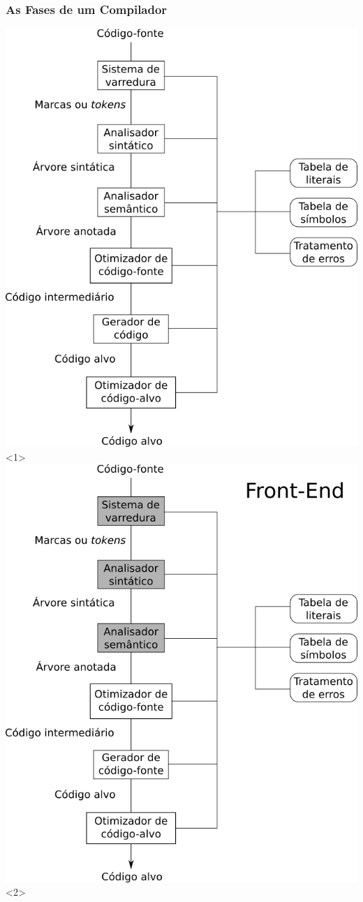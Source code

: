 \documentclass[table]{beamer}
\begin{document}
\begin{frame}
   \frametitle{As Fases de um Compilador}
   \centering
   \includegraphics[scale=0.35]{figuras/etapas.png}<1>
   \includegraphics[scale=0.35]{figuras/etapasfrontend.png}<2>

\end{frame}
\end{document}
